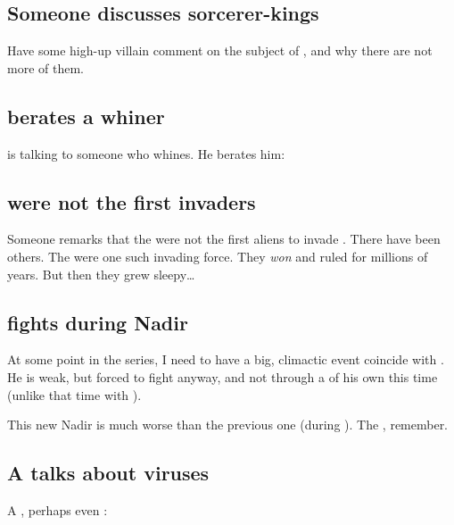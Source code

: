 \subsection{Someone discusses sorcerer-kings}
Have some high-up villain comment on the subject of , and why there are not more of them. 







\subsection{\Ishnaruchaefir{} berates a whiner}
\Ishnaruchaefir{} is talking to someone who whines. He berates him: 






\subsection{\Banes{} were not the first invaders}
Someone remarks that the \banes{} were not the first aliens to invade \Miith. 
There have been others. 
The \xss{} were one such invading force. 
They \emph{won} and ruled \Miith{} for millions of years. 
But then they grew sleepy\ldots{}







\subsection{\Ishnaruchaefir{} fights during Nadir}
At some point in the series, I need to have a big, climactic event coincide with . 
He is weak, but forced to fight anyway, and not through a \XanatosGambit{} of his own this time (unlike that time with \Teshrial). 

This new Nadir is much worse than the previous one (during \TwilightAngelRememberEmph). 
The , remember.








\subsection{A \bane{} talks about viruses}
A \bane, perhaps even \Daggerrain: 

